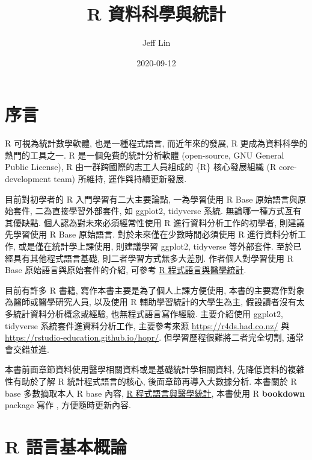 \documentclass[
]{book}
\title{R 資料科學與統計}
\author{Jeff Lin}
\date{2020-09-12}
\begin{document}
\maketitle

{
\setcounter{tocdepth}{1}
\tableofcontents
}
\hypertarget{ux5e8fux8a00}{%
\chapter*{序言}\label{ux5e8fux8a00}}

R 可視為統計數學軟體, 也是一種程式語言,
而近年來的發展, R 更成為資料科學的熱門的工具之一.
R 是一個免費的統計分析軟體 (open-source, GNU General Public License),
R 由一群跨國際的志工人員組成的 \{R\} 核心發展組織 (R core-development team) 所維持, 運作與持續更新發展.

目前對初學者的 R 入門學習有二大主要論點,
一為學習使用 R Base 原始語言與原始套件,
二為直接學習外部套件, 如 ggplot2, tidyverse 系統.
無論哪一種方式亙有其優缺點.
個人認為對未來必須經常性使用 R 進行資料分析工作的初學者,
則建議先學習使用 R Base 原始語言.
對於未來僅在少數時間必須使用 R 進行資料分析工作,
或是僅在統計學上課使用,
則建議學習 ggplot2, tidyverse 等外部套件.
至於已經具有其他程式語言基礎, 則二者學習方式無多大差別.
作者個人對學習使用 R Base 原始語言與原始套件的介紹, 可參考
\href{https://www.jefflinmd.com/book/rintro/}{R 程式語言與醫學統計}.

目前有許多 R 書籍, 寫作本書主要是為了個人上課方便使用,
本書的主要寫作對象為醫師或醫學研究人員,
以及使用 R 輔助學習統計的大學生為主,
假設讀者沒有太多統計資料分析概念或經驗,
也無程式語言寫作經驗.
主要介紹使用 ggplot2, tidyverse 系統套件進資料分析工作,
主要參考來源 \url{https://r4ds.had.co.nz/} 與 \url{https://rstudio-education.github.io/hopr/}.
但學習歷程很難將二者完全切割,
通常會交錯並進.

本書前面章節資料使用醫學相關資料或是基礎統計學相關資料,
先降低資料的複雜性有助於了解 R 統計程式語言的核心,
後面章節再導入大數據分析.
本書關於 R base 多數摘取本人 R base 內容,
\href{https://www.jefflinmd.com/book/rintro/}{R 程式語言與醫學統計},
本書使用 R \textbf{bookdown} package 寫作 \citep{R-bookdown}, 方便隨時更新內容.

\hypertarget{intro}{%
\chapter{R 語言基本概論}\label{intro}}
\end{document}
